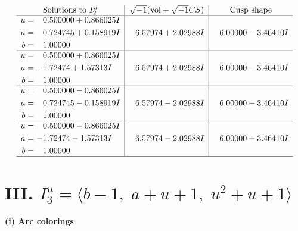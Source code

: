 \documentclass[1p]{elsarticle_modified}
\theoremstyle{definition}
\newcommand{\I}{\sqrt{-1}}
\begin{document}
$$\begin{array}{c|c|c}  
\text{Solutions to }I^u_{2}& \I (\text{vol} + \sqrt{-1}CS) & \text{Cusp shape}\\
 \hline 
\begin{aligned}
u &= \phantom{-}0.500000 + 0.866025 I \\
a &= \phantom{-}0.724745 + 0.158919 I \\
b &= \phantom{-}1.00000\phantom{ +0.000000I}\end{aligned}
 & \phantom{-}6.57974 + 2.02988 I & \phantom{-}6.00000 - 3.46410 I \\ \hline\begin{aligned}
u &= \phantom{-}0.500000 + 0.866025 I \\
a &= -1.72474 + 1.57313 I \\
b &= \phantom{-}1.00000\phantom{ +0.000000I}\end{aligned}
 & \phantom{-}6.57974 + 2.02988 I & \phantom{-}6.00000 - 3.46410 I \\ \hline\begin{aligned}
u &= \phantom{-}0.500000 - 0.866025 I \\
a &= \phantom{-}0.724745 - 0.158919 I \\
b &= \phantom{-}1.00000\phantom{ +0.000000I}\end{aligned}
 & \phantom{-}6.57974 - 2.02988 I & \phantom{-}6.00000 + 3.46410 I \\ \hline\begin{aligned}
u &= \phantom{-}0.500000 - 0.866025 I \\
a &= -1.72474 - 1.57313 I \\
b &= \phantom{-}1.00000\phantom{ +0.000000I}\end{aligned}
 & \phantom{-}6.57974 - 2.02988 I & \phantom{-}6.00000 + 3.46410 I\\
 \hline 
 \end{array}$$\newpage\newpage\renewcommand{\arraystretch}{1}
\centering \section*{III. $I^u_{3}= \langle b-1,\;a+u+1,\;u^2+u+1 \rangle$}
\flushleft \textbf{(i) Arc colorings}\\
\end{document}
